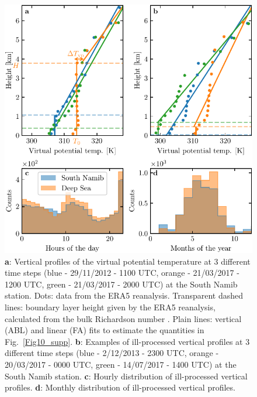 \begin{figure}
  \centering
  \includegraphics[scale=1]{Figures/Figure9_supp.pdf}
  \caption{\textbf{a}: Vertical profiles of the virtual potential temperature at 3 different time steps (blue - 29/11/2012 - 1100 UTC, orange - 21/03/2017 - 1200 UTC, green - 21/03/2017 - 2000 UTC) at the South Namib station. Dots: data from the ERA5 reanalysis. Transparent dashed lines: boundary layer height given by the ERA5 reanalysis, calculated from the bulk Richardson number \citep{seidel2012}. Plain lines: vertical (ABL) and linear (FA) fits to estimate the quantities in Fig.~\ref{Fig10_supp}. \textbf{b}: Examples of ill-processed vertical profiles at 3 different time steps (blue - 2/12/2013 - 2300 UTC, orange - 20/03/2017 - 0000 UTC, green - 14/07/2017 - 1400 UTC) at the South Namib station. \textbf{c}: Hourly distribution of ill-processed vertical profiles. \textbf{d}: Monthly distribution of ill-processed vertical profiles.}
  \label{Fig9_supp}
\end{figure}

